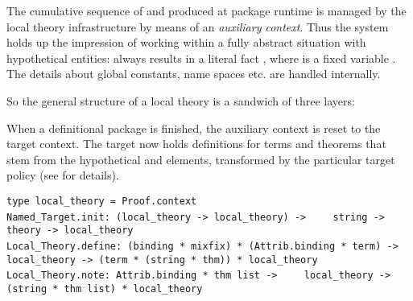 \begin{isabellebody}
\begin{isamarkuptext}
  The cumulative sequence of  and 
  produced at package runtime is managed by the local theory
  infrastructure by means of an \emph{auxiliary context}.  Thus the
  system holds up the impression of working within a fully abstract
  situation with hypothetical entities: 
  always results in a literal fact , where
   is a fixed variable .  The details about
  global constants, name spaces etc. are handled internally.

  So the general structure of a local theory is a sandwich of three
  layers:

  \begin{center}
  \end{center}

  When a definitional package is finished, the auxiliary context is
  reset to the target context.  The target now holds definitions for
  terms and theorems that stem from the hypothetical  and  elements, transformed by the
  particular target policy (see \cite[\S4--5]{Haftmann-Wenzel:2009}
  for details).%
\end{isamarkuptext}%
\isamarkuptrue%
%
\isadelimmlref
%
\endisadelimmlref
%
\isatagmlref
%
\begin{isamarkuptext}%
\begin{mldecls}
  \verb|type local_theory = Proof.context| \\
  \verb|Named_Target.init: (local_theory -> local_theory) ->|\isasep\isanewline%
\verb|    string -> theory -> local_theory| \\[1ex]
  \verb|Local_Theory.define: (binding * mixfix) * (Attrib.binding * term) ->|\isasep\isanewline%
\verb|    local_theory -> (term * (string * thm)) * local_theory| \\
  \verb|Local_Theory.note: Attrib.binding * thm list ->|\isasep\isanewline%
\verb|    local_theory -> (string * thm list) * local_theory| \\
  \end{mldecls}


\end{isamarkuptext}
\end{isabellebody}
